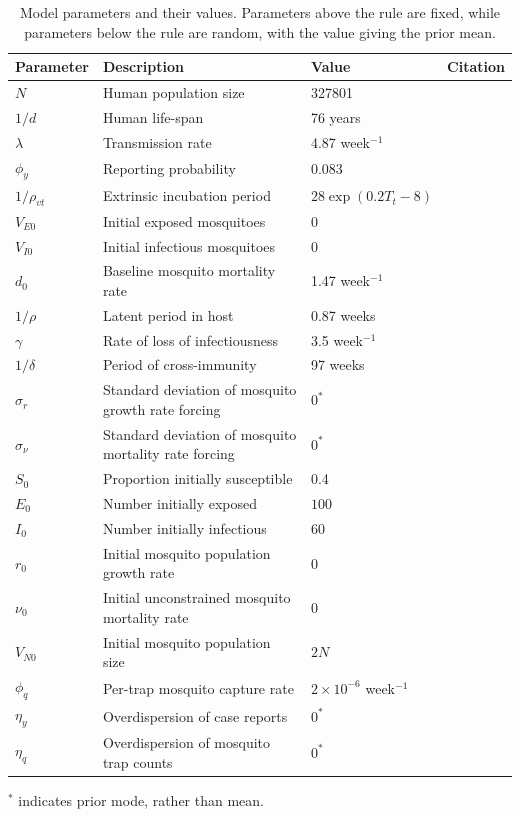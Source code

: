 \documentclass[10pt,letterpaper]{article}
\begin{document}
\begin{table}[!ht]
\label{parameters}
\begin{adjustwidth}{-2.25in}{0in} 
\begin{center}
\caption{Model parameters and their values.  Parameters above the rule are fixed, while parameters below the rule are random, with the value giving the prior mean.}
\begin{tabular}{llll}
Parameter & Description & Value & Citation\\
\hline
$N$ & Human population size & 327801 & \cite{vitpop} \\
$1/d$ & Human life-span & 76 years & \cite{vitlong} \\
$\lambda$ & Transmission rate & 4.87 week$^{-1}$ & \cite{Scott2000}\\
$\phi_y$ & Reporting probability & 0.083 & \cite{Silva2016}\\
$1/\rho_{vt}$ & Extrinsic incubation period & $28\exp \left( 0.2 T_t - 8 \right)$ & \cite{Chan2012}\\
$V_{E0}$ & Initial exposed mosquitoes &  0 & \\
$V_{I0}$ & Initial infectious mosquitoes & 0 & \\
\hline
$d_0$ & Baseline mosquito mortality rate & 1.47 week$^{-1}$ & \cite{Brady2013} \\
$1/\rho$ & Latent period in host & 0.87 weeks  & \cite{Chan2012}\\
$\gamma$ & Rate of loss of infectiousness & 3.5 week$^{-1}$ & \cite{Nguyet2013}\\
$1/\delta$ & Period of cross-immunity & 97 weeks &  \cite{Reich2013}\\
$\sigma_r$ & Standard deviation of mosquito growth rate forcing & $0^*$ & \\
$\sigma_{\nu}$ & Standard deviation of mosquito mortality rate forcing & $0^*$ & \\
$S_0$ & Proportion initially susceptible & 0.4 & \cite{Cardoso2011a} \\
$E_0$ & Number initially exposed & $100$ & \\
$I_0$ & Number initially infectious & $60$ & \\
$r_0$ & Initial mosquito population growth rate & 0 & \\
$\nu_0$ & Initial unconstrained mosquito mortality rate & 0 & \\
$V_{N0}$ & Initial mosquito population size & $2N$ & \\
$\phi_q$ & Per-trap mosquito capture rate & $2 \times 10^{-6}$ week$^{-1}$ & \\
$\eta_y$ & Overdispersion of case reports & $0^*$ & \\
$\eta_q$ & Overdispersion of mosquito trap counts & $0^*$ & \\
\end{tabular}
\end{center}
\end{adjustwidth}
$^*$ indicates prior mode, rather than mean.
\end{table}
\end{document}
